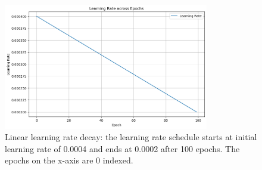 \begin{figure}[htbp]
\begin{center}
\includegraphics[width=0.8\textwidth]{Images_Thesis/Tensboard_runs_images_all/Experiment_00_Sup_D_A_no_Aug/Split_0/output_learningrate.png}
\end{center}
\caption[Linear learning rate decay used in all four experiments.]{Linear learning rate decay: the learning rate schedule starts at initial learning rate of 0.0004 and ends at 0.0002 after 100 epochs. The epochs on the x-axis are 0 indexed.}
\label{fig:learning rate plot}
\end{figure}

